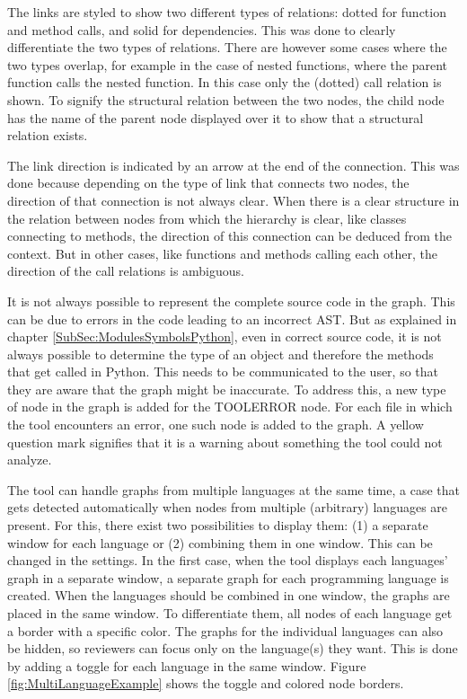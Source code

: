 \documentclass[a4paper,11pt,twoside]{article}
\theoremstyle{definition} %
\begin{document}
The links are styled to show two different types of relations: dotted for function and method calls, and solid for dependencies. This was done to clearly differentiate the two types of relations. There are however some cases where the two types overlap, for example in the case of nested functions, where the parent function calls the nested function. In this case only the (dotted) call relation is shown. To signify the structural relation between the two nodes, the child node has the name of the parent node displayed over it to show that a structural relation exists.

The link direction is indicated by an arrow at the end of the connection. This was done because depending on the type of link that connects two nodes, the direction of that connection is not always clear. When there is a clear structure in the relation between nodes from which the hierarchy is clear, like classes connecting to methods, the direction of this connection can be deduced from the context. But in other cases, like functions and methods calling each other, the direction of the call relations is ambiguous. 

It is not always possible to represent the complete source code in the graph. This can be due to errors in the code leading to an incorrect AST. But as explained in chapter \ref{SubSec:ModulesSymbolsPython}, even in correct source code, it is not always possible to determine the type of an object and therefore the methods that get called in Python. This needs to be communicated to the user, so that they are aware that the graph might be inaccurate. To address this, a new type of node in the graph is added for the TOOLERROR node. For each file in which the tool encounters an error, one such node is added to the graph. A yellow question mark signifies that it is a warning about something the tool could not analyze. 

The tool can handle graphs from multiple languages at the same time, a case that gets detected automatically when nodes from multiple (arbitrary) languages are present. For this, there exist two possibilities to display them: (1) a separate window for each language or (2) combining them in one window. This can be changed in the settings. In the first case, when the tool displays each languages’ graph in a separate window, a separate graph for each programming language is created. When the languages should be combined in one window, the graphs are placed in the same window. To differentiate them, all nodes of each language get a border with a specific color. The graphs for the individual languages can also be hidden, so reviewers can focus only on the language(s) they want. This is done by adding a toggle for each language in the same window. Figure \ref{fig:MultiLanguageExample} shows the toggle and colored node borders.
\end{document}
